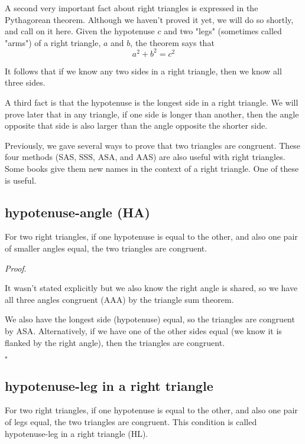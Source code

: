 \documentclass[11pt, oneside]{article}
\begin{document}
A second very important fact about right triangles is expressed in the Pythagorean theorem.  Although we haven't proved it yet, we will do so shortly, and call on it here.  Given the hypotenuse $c$ and two "legs" (sometimes called "arms") of a right triangle, $a$ and $b$, the theorem says that
\[ a^2 + b^2 = c^2 \]

It follows that if we know any two sides in a right triangle, then we know all three sides.

A third fact is that the hypotenuse is the longest side in a right triangle.  We will prove later that in any triangle, if one side is longer than another, then the angle opposite that side is also larger than the angle opposite the shorter side.

Previously, we gave several ways to prove that two triangles are congruent.  These four methods (SAS, SSS, ASA, and AAS) are also useful with right triangles.  Some books give them new names in the context of a right triangle.  One of these is useful.

\subsection*{hypotenuse-angle (HA)}

For two right triangles, if one hypotenuse is equal to the other, and also one pair of smaller angles equal, the two triangles are congruent.

\emph{Proof}.

It wasn't stated explicitly but we also know the right angle is shared, so we have all three angles congruent (AAA) by the triangle sum theorem.

We also have the longest side (hypotenuse) equal, so the triangles are congruent by ASA.  Alternatively, if we have one of the other sides equal (we know it is flanked by the right angle), then the triangles are congruent.

$\square$

\subsection*{hypotenuse-leg in a right triangle}
 
\label{sec:SSA_in_right}

For two right triangles, if one hypotenuse is equal to the other, and also one pair of legs equal, the two triangles are congruent.  This condition is called hypotenuse-leg in a right triangle (HL).
\end{document}
